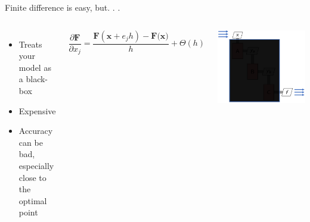 \documentclass[aspectratio=169, usenames,dvipsnames, 14pt]{beamer}
\begin{document}
\begin{frame}{Finite difference is easy, but. . .} 

\begin{columns}
        \begin{itemize}
            \item Treats your model as a black-box
            \item Expensive
            \item Accuracy can be bad, especially close to the optimal point
        \end{itemize}
        
        \vspace{-0.5cm}
        
        \begin{equation*}
            \frac{\partial \textbf{F}}{\partial x_{j}} =\frac{ \textbf{F}(\textbf{x}+e_{j}h)-\textbf{F(x)}}{h} +\Theta (h)
        \end{equation*}
        
    \includegraphics[scale=0.3]{images/slide73.png}
    
\end{columns}
    
\end{frame}
    
\end{document}
